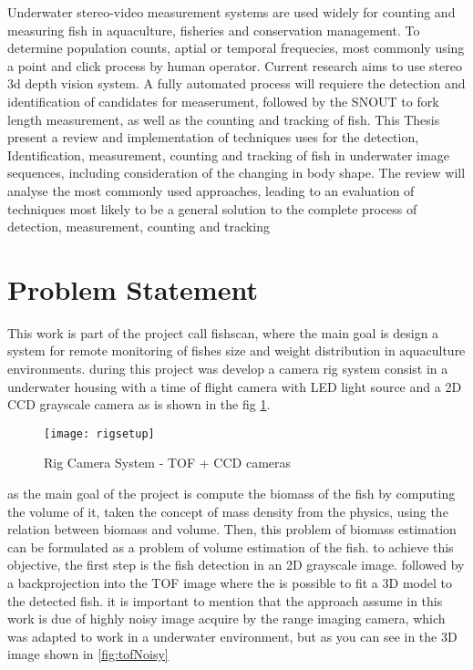 Underwater stereo-video measurement systems are used widely for counting
and measuring fish in aquaculture, fisheries and conservation management.
To determine population counts, aptial or temporal frequecies, most commonly
 using a point and click process by human operator.
Current research aims to use stereo 3d depth vision system. 
A fully automated process will requiere the detection and identification
of candidates for measerument, followed by the SNOUT to fork length measurement, 
as well as the counting and tracking of fish. This Thesis present a review and 
implementation of techniques uses for the detection, Identification, measurement, 
counting and tracking of fish in underwater image sequences, including consideration 
of the changing in body shape.
The review will analyse the most commonly used approaches, leading to an evaluation 
of techniques most likely to be a  general solution to the complete process of 
detection, measurement, counting and tracking


\section{Problem Statement}

This work is part of the project call fishscan, where the main goal is design a system for remote monitoring of fishes size and weight distribution in aquaculture environments. during this project was develop a camera rig system consist in a underwater housing with a time of flight camera with LED light source and a 2D CCD grayscale camera as is shown in the fig \ref{fig:rigsetup}.

\begin{figure}[h]
\centering
\texttt{[image: rigsetup]}
\caption{Rig Camera System - TOF + CCD cameras}
\label{fig:rigsetup}
\end{figure}


as the main goal of the project is compute the biomass of the fish by computing 
the volume of it, taken the concept of mass density from the physics, using the relation
between biomass and volume. Then, this problem of biomass estimation can be formulated
as a problem of volume estimation of the fish. to achieve this objective, the first 
step is the fish detection in an 2D grayscale image. followed by a backprojection 
into the TOF image where the is possible to fit a 3D model to the detected fish.
it is important to mention that the approach assume in this work is due of highly 
noisy image acquire by the range imaging camera, which was adapted to work in a 
underwater environment, but as you can see in the 3D image shown in \ref{fig:tofNoisy}


